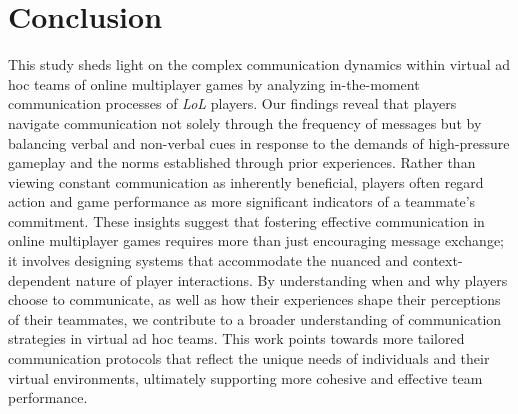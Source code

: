 \section{Conclusion}

This study sheds light on the complex communication dynamics within virtual ad hoc teams of online multiplayer games by analyzing in-the-moment communication processes of \textit{LoL} players. Our findings reveal that players navigate communication not solely through the frequency of messages but by balancing verbal and non-verbal cues in response to the demands of high-pressure gameplay and the norms established through prior experiences. Rather than viewing constant communication as inherently beneficial, players often regard action and game performance as more significant indicators of a teammate's commitment. These insights suggest that fostering effective communication in online multiplayer games requires more than just encouraging message exchange; it involves designing systems that accommodate the nuanced and context-dependent nature of player interactions. By understanding when and why players choose to communicate, as well as how their experiences shape their perceptions of their teammates, we contribute to a broader understanding of communication strategies in virtual ad hoc teams. This work points towards more tailored communication protocols that reflect the unique needs of individuals and their virtual environments, ultimately supporting more cohesive and effective team performance.